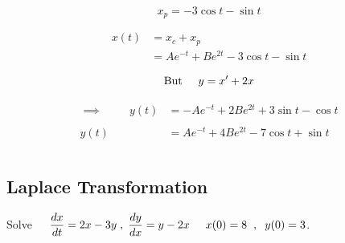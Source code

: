 \documentclass[11pt,a4paper]{article}
\theoremstyle{definition}
\begin{document}
$$x_p = -3\cos t - \sin t$$

\begin{align*}
x(t) & = x_c + x_p\\
& = A e^{-t} + B e^{2t} -3\cos t - \sin t
\end{align*}

$$\text{But}\hspace{0.5cm} y = x' + 2x$$

\begin{align*}
\implies \hspace{1cm} y(t) & = -Ae^{-t} + 2Be^{2t} + 3\sin t - \cos t\\\\
y(t) & = Ae^{-t} + 4Be^{2t} - 7\cos t + \sin t\\\\
\end{align*}

{\color[wave]{485}\subsection{Laplace Transformation}}

Solve $\hspace{0.4cm} \dfrac{dx}{dt} = 2x - 3y\hspace{0.1cm}, \hspace{0.1cm} \dfrac{dy}{dx}= y - 2x\hspace{0.5cm} x(0) = 8 \hspace{0.2cm},\hspace{0.2cm} y(0) = 3$.
\end{document}
